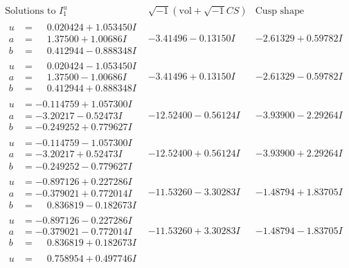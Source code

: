 \documentclass[1p]{elsarticle_modified}
\theoremstyle{definition}
\newcommand{\I}{\sqrt{-1}}
\begin{document}
$$\begin{array}{c|c|c}  
\text{Solutions to }I^u_{1}& \I (\text{vol} + \sqrt{-1}CS) & \text{Cusp shape}\\
 \hline 
\begin{aligned}
u &= \phantom{-}0.020424 + 1.053450 I \\
a &= \phantom{-}1.37500 + 1.00686 I \\
b &= \phantom{-}0.412944 - 0.888348 I\end{aligned}
 & -3.41496 - 0.13150 I & -2.61329 + 0.59782 I \\ \hline\begin{aligned}
u &= \phantom{-}0.020424 - 1.053450 I \\
a &= \phantom{-}1.37500 - 1.00686 I \\
b &= \phantom{-}0.412944 + 0.888348 I\end{aligned}
 & -3.41496 + 0.13150 I & -2.61329 - 0.59782 I \\ \hline\begin{aligned}
u &= -0.114759 + 1.057300 I \\
a &= -3.20217 - 0.52473 I \\
b &= -0.249252 + 0.779627 I\end{aligned}
 & -12.52400 - 0.56124 I & -3.93900 - 2.29264 I \\ \hline\begin{aligned}
u &= -0.114759 - 1.057300 I \\
a &= -3.20217 + 0.52473 I \\
b &= -0.249252 - 0.779627 I\end{aligned}
 & -12.52400 + 0.56124 I & -3.93900 + 2.29264 I \\ \hline\begin{aligned}
u &= -0.897126 + 0.227286 I \\
a &= -0.379021 + 0.772014 I \\
b &= \phantom{-}0.836819 - 0.182673 I\end{aligned}
 & -11.53260 - 3.30283 I & -1.48794 + 1.83705 I \\ \hline\begin{aligned}
u &= -0.897126 - 0.227286 I \\
a &= -0.379021 - 0.772014 I \\
b &= \phantom{-}0.836819 + 0.182673 I\end{aligned}
 & -11.53260 + 3.30283 I & -1.48794 - 1.83705 I \\ \hline\begin{aligned}
u &= \phantom{-}0.758954 + 0.497746 I \\

\end{aligned}
\end{array}$$
\end{document}
